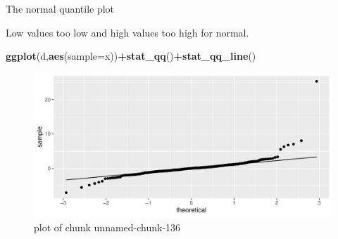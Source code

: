 \documentclass[ignorenonframetext,]{beamer}
\newenvironment{Shaded}{\begin{snugshade}}{\end{snugshade}}
\newcommand{\DataTypeTok}[1]{\textcolor[rgb]{0.13,0.29,0.53}{#1}}
\newcommand{\KeywordTok}[1]{\textcolor[rgb]{0.13,0.29,0.53}{\textbf{#1}}}
\newcommand{\NormalTok}[1]{#1}
\newcommand{\OperatorTok}[1]{\textcolor[rgb]{0.81,0.36,0.00}{\textbf{#1}}}
\begin{document}
\begin{frame}[fragile]{The normal quantile plot}
\protect\hypertarget{the-normal-quantile-plot-5}{}

Low values too low and high values too high for normal.

\begin{Shaded}
\begin{Highlighting}[]
\KeywordTok{ggplot}\NormalTok{(d,}\KeywordTok{aes}\NormalTok{(}\DataTypeTok{sample=}\NormalTok{x))}\OperatorTok{+}\KeywordTok{stat_qq}\NormalTok{()}\OperatorTok{+}\KeywordTok{stat_qq_line}\NormalTok{()}
\end{Highlighting}
\end{Shaded}

\begin{figure}
\centering
\includegraphics{figure/unnamed-chunk-136-1.pdf}
\caption{plot of chunk unnamed-chunk-136}
\end{figure}

\end{frame}
\end{document}
